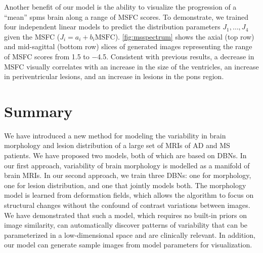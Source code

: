 Another benefit of our model is the ability to visualize the progression of a
``mean'' \gls{spms} brain along a range of MSFC scores.
To demonstrate, we trained four independent linear models to predict the
distribution parameters $J_1, \dotsc, J_4$ given the MSFC ($J_i = a_i +
b_i\text{MSFC}$). \ref{fig:msspectrum} shows the axial (top row) and
mid-sagittal (bottom row) slices of generated images representing the range of
MSFC scores from \num{1.5} to \num{-4.5}. Consistent with previous results, a
decrease in MSFC visually correlates with an increase in the size of the
ventricles, an increase in periventricular lesions, and an increase in lesions
in the pons region.

\section{Summary}


We have introduced a new method for modeling the variability in brain morphology
and lesion distribution of a large set of MRIs of AD and MS patients. We have
proposed two models, both of which are based on DBNs. In our first approach,
variability of brain morphology is modelled as a manifold of brain MRIs. In our
second approach, we train three DBNs: one for morphology, one for lesion
distribution, and one that jointly models both. The morphology model is learned
from deformation fields, which allows the algorithm to focus on structural
changes without the confound of contrast variations between images. We have
demonstrated that such a model, which requires no built-in priors on image
similarity, can automatically discover patterns of variability that can be
parameterized in a low-dimensional space and are clinically relevant. In
addition, our model can generate sample images from model parameters for
visualization. 

